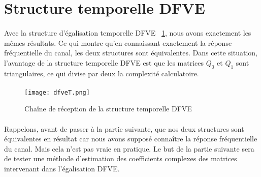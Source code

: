 \section{Structure temporelle DFVE}
\paragraph{}
Avec la structure d'égalisation temporelle DFVE ~\ref{dfveT}, nous avons
exactement les mêmes résultats. Ce qui montre qu'en connaissant exactement la
réponse fréquentielle du canal, les deux structures sont équivalentes. Dans
cette situation, l'avantage de la structure temporelle DFVE est que les matrices
$Q_0$ et $Q_1$ sont triangulaires, ce qui divise par deux la complexité calculatoire.
\paragraph{}
\vspace{1\baselineskip}
\begin{figure}[!h]
  \centering
  \texttt{[image: dfveT.png]}
  \caption{Chaîne de réception de la structure temporelle DFVE}
	\label{dfveT}
\end{figure}
\vspace{2\baselineskip}

\paragraph{}
Rappelons, avant de passer à la partie suivante, que nos deux structures sont
équivalentes en résultat car nous avons supposé connaître la réponse
fréquentielle du canal. Mais cela n'est pas vraie en pratique. Le but de la
partie suivante sera de tester une méthode d'estimation des coefficients
complexes des matrices intervenant dans l'égalisation DFVE.

